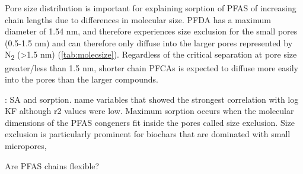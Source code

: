 Pore size distribution is important for explaining sorption of PFAS of increasing chain lengths due to differences in molecular size. PFDA has a maximum diameter of 1.54 nm, and therefore experiences size exclusion for the small pores (0.5-1.5 nm) and can therefore only diffuse into the larger pores represented by N\textsubscript{2} (\textgreater 1.5 nm) (\cref{tab:molecsize}). Regardless of the critical separation at pore size greater/less than 1.5 nm, shorter chain PFCAs is expected to diffuse more easily into the pores than the larger compounds.  

\citep{Hale2016}: SA and sorption. name variables that showed the strongest correlation with log KF although r2 values were low. Maximum sorption occurs when the molecular dimensions of the PFAS congeners fit inside the pores called size exclusion. Size exclusion is particularly prominent for biochars that are dominated with small micropores, 

Are PFAS chains flexible? 

\begin{table}
\centering
\caption{Surface area, pore volume and elemental content (C, O, H, N) and ratios for the biochars produced for the batch tests.}
\end{table}


